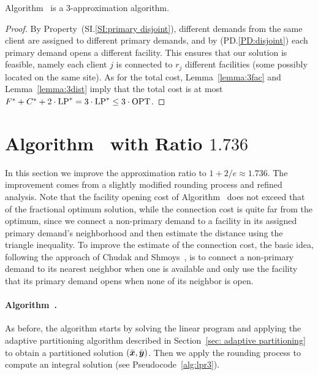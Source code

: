 \documentclass{llncs}
\begin{document}

\begin{theorem}
Algorithm~{\EGUP} is a $3$-approximation algorithm.
\end{theorem}

\begin{proof}
  By Property~(SI.\ref{SI:primary disjoint}), different
  demands from the same client are assigned to different
  primary demands, and by (PD.\ref{PD:disjoint}) each primary
  demand opens a different facility. This ensures that our
  solution is feasible, namely each client $j$ is connected
  to $r_j$ different facilities (some possibly located on
  the same site).  As for the total cost,
  Lemma~\ref{lemma:3fac} and Lemma~\ref{lemma:3dist} imply
  that the total cost is at most
  $F^\ast+C^\ast+2\cdot\mbox{\rm LP}^\ast = 3\cdot\mbox{\rm LP}^\ast \leq
  3\cdot\mbox{\rm OPT}$.
\end{proof}



\section{Algorithm~{\ECHS} with Ratio $1.736$}\label{sec: 1.736-approximation}

In this section we improve the approximation ratio to $1+2/e \approx
1.736$. The improvement comes from a slightly modified rounding
process and refined analysis.  Note that the facility opening cost of
Algorithm~{\EGUP} does not exceed that of the fractional optimum
solution, while the connection cost is quite far from the optimum,
since we connect a non-primary demand to a facility in its assigned
primary demand's neighborhood and then estimate the distance using the
triangle inequality. To improve the estimate of the connection cost,
the basic idea, following the approach of Chudak and
Shmoys~\cite{ChudakS04}, is to connect a non-primary demand to its
nearest neighbor when one is available and only use the facility that
its primary demand opens when none of its neighbor is open.


\paragraph{Algorithm~{\ECHS}.}  As before, the algorithm starts by
solving the linear program and applying the adaptive partitioning
algorithm described in Section~\ref{sec: adaptive partitioning} to
obtain a partitioned solution $(\bar{\boldsymbol{x}}, \bar{\boldsymbol{y}})$. Then we apply the
rounding process to compute an integral solution (see
Pseudocode~\ref{alg:lpr3}).
\end{document}
